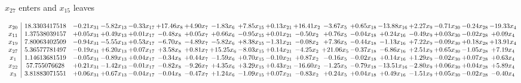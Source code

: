 \documentclass[9pt]{article}
\begin{document}
 $ x_{27} $ enters and $ x_{15} $ leaves 

 \[\begin{array}{c| c c@{\hskip 2pt} c@{\hskip 2pt} c@{\hskip 2pt} c@{\hskip 2pt} c@{\hskip 2pt} c@{\hskip 2pt} c@{\hskip 2pt} c@{\hskip 2pt} c@{\hskip 2pt} c@{\hskip 2pt} c@{\hskip 2pt} c@{\hskip 2pt} c@{\hskip 2pt} c@{\hskip 2pt} c@{\hskip 2pt} c@{\hskip 2pt} }
 x_{20}   &  18.3303417518 & -0.21 x_{31} & -5.82 x_{13} & -0.33 x_{17} & + 17.46 x_{8} & +  4.90 x_{7} & -1.83 x_{6} & +  7.85 x_{15} & +  0.13 x_{21} & + 16.41 x_{2} & -3.67 x_{5} & +  0.65 x_{18} & -13.88 x_{16} & +  2.27 x_{9} & -0.71 x_{30} & -0.24 x_{28} & -19.33 x_{4}\\
 x_{11}   &  1.37538039157 & +  0.05 x_{31} & +  0.49 x_{13} & +  0.01 x_{17} & -0.48 x_{8} & +  0.05 x_{7} & +  0.66 x_{6} & -0.95 x_{15} & +  0.01 x_{21} & -0.50 x_{2} & +  0.76 x_{5} & -0.04 x_{18} & +  0.24 x_{16} & -0.49 x_{9} & +  0.03 x_{30} & -0.02 x_{28} & +  0.09 x_{4}\\
 x_{19}   &  7.80063402509 & -0.94 x_{31} & -5.55 x_{13} & +  0.53 x_{17} & -6.70 x_{8} & -4.89 x_{7} & -5.82 x_{6} & +  8.38 x_{15} & -1.31 x_{21} & -0.08 x_{2} & +  7.36 x_{5} & -0.44 x_{18} & -1.13 x_{16} & +  7.22 x_{9} & -0.09 x_{30} & +  0.18 x_{28} & + 13.91 x_{4}\\
 x_{27}   &  5.36577781497 & -0.19 x_{31} & +  6.20 x_{13} & +  0.07 x_{17} & +  3.58 x_{8} & +  0.81 x_{7} & + 15.25 x_{6} & -8.03 x_{15} & +  0.14 x_{21} & -4.25 x_{2} & + 21.06 x_{5} & -0.37 x_{18} & -6.86 x_{16} & +  2.51 x_{9} & +  0.65 x_{30} & -1.05 x_{28} & +  7.19 x_{4}\\
 x_{1}   &  1.14613681519 & -0.05 x_{31} & -0.89 x_{13} & +  0.04 x_{17} & -0.34 x_{8} & +  0.44 x_{7} & -1.59 x_{6} & +  0.70 x_{15} & -0.10 x_{21} & +  0.87 x_{2} & -0.16 x_{5} & -0.02 x_{18} & +  0.14 x_{16} & +  1.29 x_{9} & -0.02 x_{30} & +  0.07 x_{28} & +  0.63 x_{4}\\
 x_{22}   &  57.755076628 & +  0.21 x_{31} & -1.42 x_{13} & -0.01 x_{17} & -0.82 x_{8} & -9.26 x_{7} & +  4.35 x_{6} & +  3.29 x_{15} & +  0.43 x_{21} & -16.60 x_{2} & -1.25 x_{5} & -0.79 x_{18} & -13.51 x_{16} & -2.80 x_{9} & +  0.06 x_{30} & +  0.04 x_{28} & +  5.89 x_{4}\\
 x_{3}   &  3.81883071551 & +  0.06 x_{31} & +  0.67 x_{13} & -0.04 x_{17} & -0.04 x_{8} & -0.47 x_{7} & +  1.24 x_{6} & -1.09 x_{15} & +  0.07 x_{21} & -0.83 x_{2} & +  0.24 x_{5} & +  0.04 x_{18} & +  0.49 x_{16} & -1.51 x_{9} & +  0.05 x_{30} & -0.02 x_{28} & -0.40 x_{4}\\

\end{array}\]
\end{document}
